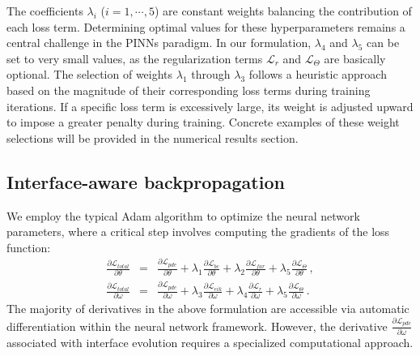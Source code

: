 \documentclass[final,hidelinks,onefignum,onetabnum]{siamart251216}
\begin{document}
The coefficients $\lambda_i$ ($i=1,\cdots,5$) are constant weights balancing the contribution of each loss term. Determining optimal values for these hyperparameters remains a central challenge in the PINNs paradigm. In our formulation, $\lambda_4$ and $\lambda_5$ can be set to very small values, as the regularization terms $\mathcal{L}_r$ and $\mathcal{L}_{\Theta}$ are basically optional. The selection of weights $\lambda_1$ through $\lambda_3$ follows a heuristic approach based on the magnitude of their corresponding loss terms during training iterations. If a specific loss term is excessively large, its weight is adjusted upward to impose a greater penalty during training. Concrete examples of these weight selections will be provided in the numerical results section.

\subsection{Interface-aware backpropagation}
We employ the typical Adam algorithm \cite{kinba14} to optimize the neural network parameters, where a critical step involves computing the gradients of the loss function:
\begin{eqnarray}
\frac{\partial\mathcal{L}_{total}}{\partial\theta}&=&\frac{\partial\mathcal{L}_{pde}}{\partial\theta}+\lambda_1\frac{\partial\mathcal{L}_{bc}}{\partial\theta}+\lambda_2\frac{\partial\mathcal{L}_{far}}{\partial\theta}+\lambda_5\frac{\partial\mathcal{L}_{\Theta}}{\partial\theta}\,, \\
\frac{\partial\mathcal{L}_{total}}{\partial\omega}&=&\frac{\partial\mathcal{L}_{pde}}{\partial\omega}+\lambda_3\frac{\partial\mathcal{L}_{eik}}{\partial\omega}+\lambda_4\frac{\partial\mathcal{L}_r}{\partial\omega}+\lambda_5\frac{\partial\mathcal{L}_{\Theta}}{\partial\omega}\,.
\end{eqnarray}
The majority of derivatives in the above formulation are accessible via automatic differentiation within the neural network framework. However, the derivative $\frac{\partial\mathcal{L}_{pde}}{\partial\omega}$ associated with interface evolution requires a specialized computational approach.
\end{document}
